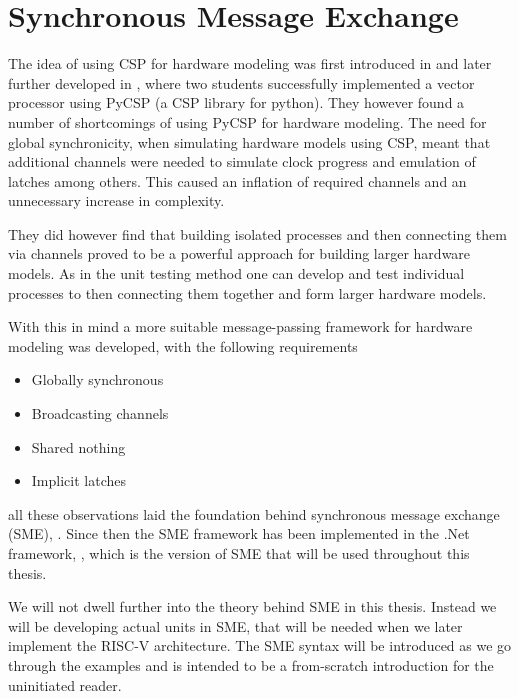 \section{Synchronous Message Exchange}
    The idea of using CSP for hardware modeling was first introduced in \citet{BPUSimulator2013} and later further developed in \cite{PyCSPFPGA}, where two students successfully implemented a vector processor using PyCSP (a CSP library for python).  They however found a number of shortcomings of using PyCSP for hardware modeling. The need for global synchronicity, when simulating hardware models using CSP, meant that additional channels were needed to simulate clock progress and emulation of latches among others. This caused an inflation of required channels and an unnecessary increase in complexity.
    
    They did however find that building isolated processes and then connecting them via channels proved to be a powerful approach for building larger hardware models. As in the unit testing method one can develop and test individual processes to then connecting them together and form larger hardware models.
    
    With this in mind a more suitable message-passing framework for hardware modeling was developed, with the following requirements
    
    \begin{itemize}
        \item Globally synchronous
        \item Broadcasting channels
        \item Shared nothing
        \item Implicit latches
    \end{itemize} 
    
    all these observations laid the foundation behind synchronous message exchange (SME),  \citet{vinter2014synchronous}. 
    Since then the SME framework has been implemented in the .Net framework, \citet{skovhede2016building}, which is the version of SME that will be used throughout this thesis. 
    
    We will not dwell further into the theory behind SME in this thesis. Instead we will be developing actual units in SME, that will be needed when we later implement the RISC-V architecture. The SME syntax will be introduced as we go through the examples and is intended to be a from-scratch introduction for the uninitiated reader. 

